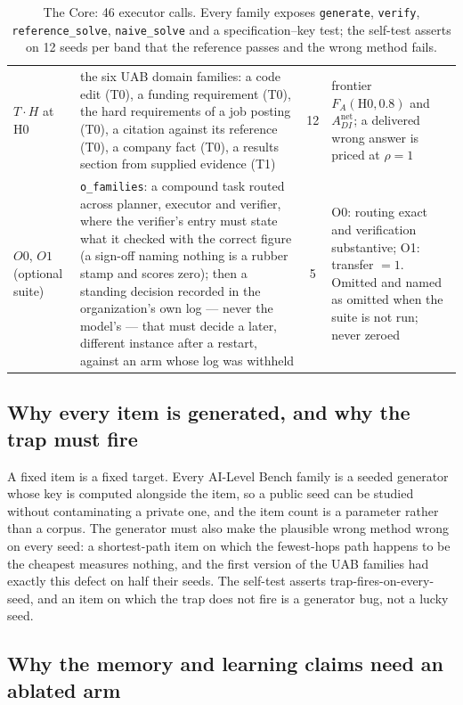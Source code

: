 \begin{table}[!htbp]
\begin{tabularx}{\textwidth}{@{}>{\raggedright\arraybackslash}p{1.9cm}>{\raggedright\arraybackslash}p{7.4cm}cY@{}}
$T \cdot H$ at H0 & the six UAB domain families: a code edit (T0), a funding requirement (T0), the hard requirements of a job posting (T0), a citation against its reference (T0), a company fact (T0), a results section from supplied evidence (T1) & 12 & frontier $F_A(\text{H0}, 0.8)$ and $A^{\text{net}}_{DI}$; a delivered wrong answer is priced at $\rho = 1$ \\
$O0$, $O1$ (optional suite) & \texttt{o\_families}: a compound task routed across planner, executor and verifier, where the verifier's entry must state what it checked with the correct figure (a sign-off naming nothing is a rubber stamp and scores zero); then a standing decision recorded in the organization's own log --- never the model's --- that must decide a later, different instance after a restart, against an arm whose log was withheld & 5 & O0: routing exact and verification substantive; O1: transfer $= 1$. Omitted and named as omitted when the suite is not run; never zeroed \\
\bottomrule
\end{tabularx}
\caption{The Core: 46 executor calls. Every family exposes \texttt{generate}, \texttt{verify}, \texttt{reference\_solve}, \texttt{naive\_solve} and a specification--key test; the self-test asserts on 12 seeds per band that the reference passes and the wrong method fails.}
\label{tab:core}
\end{table}

\subsection{Why every item is generated, and why the trap must fire}

A fixed item is a fixed target. Every AI-Level Bench family is a seeded generator whose key is computed alongside the item, so a public seed can be studied without contaminating a private one, and the item count is a parameter rather than a corpus. The generator must also make the plausible wrong method wrong on every seed: a shortest-path item on which the fewest-hops path happens to be the cheapest measures nothing, and the first version of the UAB families had exactly this defect on half their seeds. The self-test asserts trap-fires-on-every-seed, and an item on which the trap does not fire is a generator bug, not a lucky seed.

\subsection{Why the memory and learning claims need an ablated arm}

